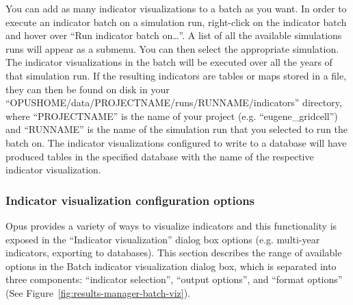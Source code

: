 You can add as many indicator visualizations to a batch as you want. In
order to execute an indicator batch on a simulation run, right-click on
the indicator batch and hover over
 ``Run indicator batch on\ldots''. A list of all the available simulations
 runs will
appear as a submenu. You can then select the appropriate simulation.
The indicator visualizations in the batch will be executed over all the
years of that simulation run. If the resulting indicators are tables or
maps stored in a file, they can then be found on disk in your
``OPUSHOME/data/PROJECTNAME/runs/RUNNAME/indicators'' directory, where
``PROJECTNAME'' is the name of your project (e.g.
 ``eugene\_gridcell'') and ``RUNNAME'' is the name of the
simulation run that you selected to run the batch on. The indicator
visualizations configured to write to a database will have produced
tables in the specified database with the name of the respective
indicator visualization.



\subsubsection{Indicator visualization configuration options}
\label{sect:indicator-visualization-options}

Opus provides a variety of ways to visualize indicators and this
functionality is exposed in the ``Indicator visualization'' dialog
box options (e.g. multi-year indicators, exporting to
databases). This section describes the range
of available options in the Batch indicator visualization dialog
box, which is separated into three components:  ``indicator
selection'',  ``output options'', and  ``format options'' (See
Figure~\ref{fig:results-manager-batch-viz}). 


